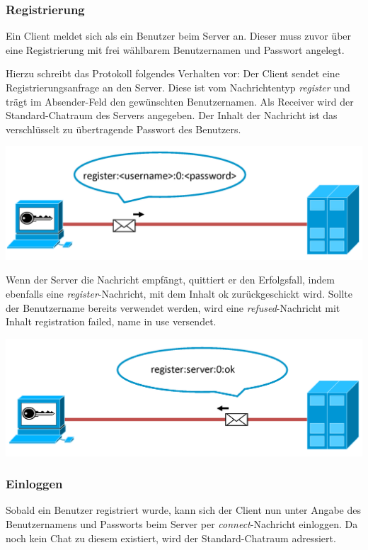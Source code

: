 \documentclass[12pt,a4paper,bibliography=totocnumbered,listof=totocnumbered]{scrartcl}
\begin{document}
\subsubsection{Registrierung}
Ein Client meldet sich als ein Benutzer beim Server an. Dieser muss zuvor über eine Registrierung mit frei wählbarem Benutzernamen und Passwort angelegt.

Hierzu schreibt das Protokoll folgendes Verhalten vor: 
Der Client sendet eine Registrierungsanfrage an den Server. Diese ist vom Nachrichtentyp \textit{register} und trägt im Absender-Feld den gewünschten Benutzernamen. Als Receiver wird der Standard-Chatraum des Servers angegeben. Der Inhalt der Nachricht ist das verschlüsselt zu übertragende Passwort des Benutzers.

\vspace{1em}
\begin{minipage}{\linewidth}
	\centering
	\includegraphics[width=0.7\linewidth]{img/register1.png}
	\label{fig:Registrierung1}
\end{minipage}
\vspace{0.5em}

Wenn der Server die Nachricht empfängt, quittiert er den Erfolgsfall, indem ebenfalls eine  \textit{register}-Nachricht, mit dem Inhalt \glqq ok\grqq{} zurückgeschickt wird. Sollte der Benutzername bereits verwendet werden, wird eine \textit{refused}-Nachricht mit Inhalt \glqq registration failed, name in use\grqq{} versendet.

\vspace{1em}
\begin{minipage}{\linewidth}
	\centering
	\includegraphics[width=0.7\linewidth]{img/register2.png}
	\label{fig:Registrierung2}
\end{minipage}
\vspace{0.5em}

\subsubsection{Einloggen}
Sobald ein Benutzer registriert wurde, kann sich der Client nun unter Angabe des Benutzernamens und Passworts beim Server per \textit{connect}-Nachricht einloggen. Da noch kein Chat zu diesem existiert, wird der Standard-Chatraum adressiert.
\end{document}
